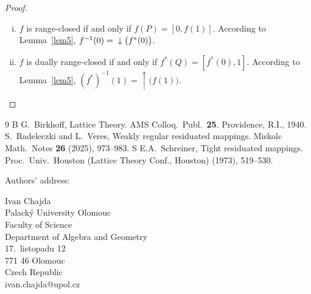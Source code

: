 \documentclass[12pt]{article}
\begin{document}
\begin{proof}
$\text{}$
\begin{enumerate}[(i)]
\item $f$ is range-closed if and only if $f(P)=[0,f(1)]$. According to Lemma~\ref{lem5}, $f^{-1}(0)= \\
\downarrow\big(f^*(0)\big)$.
\item $f$ is dually range-closed if and only if $f^*(Q)=[f^*(0),1]$. According to Lemma~\ref{lem5}, $(f^*)^{-1}(1)=\uparrow\big(f(1)\big)$.
\end{enumerate}
\end{proof}








\begin{thebibliography}9
\bibitem B
G.~Birkhoff, Lattice Theory. AMS Colloq.\ Publ.\ {\bf25}. Providence, R.I., 1940.
S.~Radeleczki and L.~Veres, Weakly regular residuated mappings. Miskolc Math.\ Notes {\bf26} (2025), 973--983.
\bibitem S
E.A.~Schreiner, Tight residuated mappings. Proc.\ Univ.\ Houston (Lattice Theory Conf., Houston) (1973), 519--530.
\end{thebibliography}

Authors' address:

Ivan Chajda \\
Palack\'y University Olomouc \\
Faculty of Science \\
Department of Algebra and Geometry \\
17.\ listopadu 12 \\
771 46 Olomouc \\
Czech Republic \\
ivan.chajda@upol.cz
\end{document}
